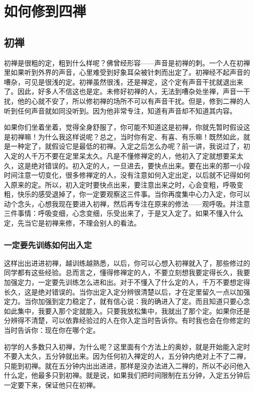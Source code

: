 \documentclass{book}
\begin{document}
\section{如何修到四禅}

\subsection{初禅}

初禅是很粗的定，粗到什么样呢？佛曾经形容——声音是初禅的刺。一个人在初禅里如果听到外界的声音，心里难受到好象耳朵被针刺而出定了。初禅经不起声音的嘈杂，可见是很浅的定。初禅虽然很浅，还是禅定，这个定有声音干扰就退出来了。因此，好多人不信这也是定。未修好初禅的人，无法到嘈杂处坐禅，声音一干扰，他的心就不安了，所以修初禅的场所不可以有声音干扰。但是，修到二禅的人听到任何声音就如同没听到。因为他非常专注，知道有声音却不知道其内容。

如果你们坐着坐着，觉得全身舒服了，你可能不知道这是初禅，你就先暂时假设这是初禅嘛！为什么我这样说呢？总之，当时你有定、有喜、有乐嘛！既然如此，就是一种定了，就假设它是最低的初禅。入定之后怎么办呢？前一讲，我说过了，初入定的人千万不要在定里呆太久。凡是不懂修禅定的人，他初入了定就想要呆太久，这是绝对错误的。初入定的人，一旦进去，要快点出来。要在出来的那一小段时间注意一切变化，很多修禅定的人，没有注意如何入定出定，以后就不记得如何入原来的定。所以，初入定时要快点出来，要注意出来之时，心会变粗，呼吸变粗，快乐的感受退掉了，你一定要观察这三件事。当你再度集中心力入定，你可以动个念头，心想我现在要进入初禅，然后再专注在原来的修法——观呼吸。并注意三件事情：呼吸变细，心念变细，乐受出来了，于是又入定了。如果不懂入什么定，先当它是初禅来修，不理会别人的看法。

\subsubsection{一定要先训练如何出入定}

这样出出进进初禅，越训练越熟悉，以后，你可以心想入初禅就入了，那些修过的同学都有这些经验。总而言之，懂得修禅定的人，不要立刻想我要定得长久，我要加强定力，一定要先训练怎么进和出。对于不懂入了什么定的人，千万不要想定得长久，这是绝对错误的。当你出定入定分辨很清楚以后，才在定里留久一点以加强定力。当你加强到定力稳定了，就有信心说：我的确进入了定。而且知道只要心念如此集中，我要入那个定就能入。只要我放松集中，我就出了那个定。如果你还是分辨得不清楚，可以依靠经验过的人在你入定当时告诉你。有时我也会在你修定的当时告诉你：现在你在哪个定。

初学的人多数只入初禅，为什么呢？这里面有个方法上的奥妙，就是开始能入定时不要入太久，五分钟就出来。因为任何初入禅定的人，五分钟内绝对上不了二禅，只能到初禅。就在五分钟内出出进进，那样是没办法进入二禅的，所以不必问他入什么定，他最多只到初禅。就是说，如果我们把时间限制在五分钟，入定五分钟后一定要下来，保证他只在初禅。
\end{document}
